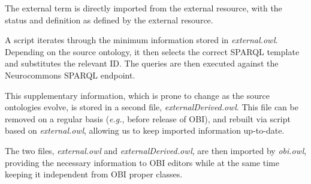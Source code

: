 \documentclass[a4paper,10pt,twocolumn]{article}
\begin{document}


The external term is directly imported from the external resource, with the status and definition as defined by the external resource. %

A script iterates through the minimum information stored in \emph{external.owl}.
Depending on the source ontology, it then selects the correct SPARQL template and substitutes the relevant ID.
The queries are then executed against the Neurocommons SPARQL endpoint\cite{RefWorks:1540}.

This supplementary information, which is prone to change as the source ontologies evolve, is stored in a second file, \emph{externalDerived.owl}.%
This file can be removed on a regular basis (\emph{e.g.}, before release of OBI), and rebuilt via script based on \emph{external.owl}, allowing us to keep imported information up-to-date.

The two files, \emph{external.owl} and \emph{externalDerived.owl}, are then imported by \emph{obi.owl}, providing the necessary information to OBI editors while at the same time keeping it independent from OBI proper classes.


\end{document}
